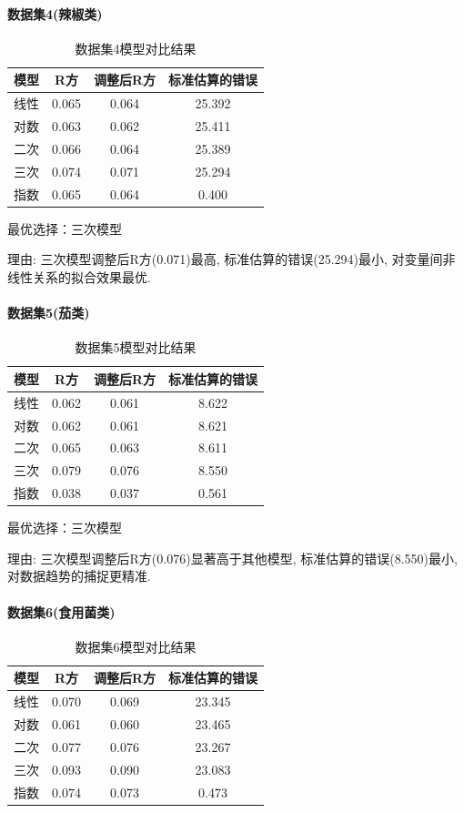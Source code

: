 \documentclass{cumcmthesis}
\begin{document}
\paragraph{数据集4(辣椒类)}
\begin{table}[H]
\centering
\begin{tabular}{cccc}
\hline
模型 & R方 & 调整后R方 & 标准估算的错误 \\
\hline
线性 & 0.065 & 0.064 & 25.392 \\
对数 & 0.063 & 0.062 & 25.411 \\
二次 & 0.066 & 0.064 & 25.389 \\
三次 & 0.074 & 0.071 & 25.294 \\
指数 & 0.065 & 0.064 & 0.400 \\
\hline
\end{tabular}
\caption{数据集4模型对比结果}
\label{tab:dataset4}
\end{table}

最优选择：三次模型

理由: 三次模型调整后R方(0.071)最高, 标准估算的错误(25.294)最小, 对变量间非线性关系的拟合效果最优. 


\paragraph{数据集5(茄类)}
\begin{table}[H]
\centering
\begin{tabular}{cccc}
\hline
模型 & R方 & 调整后R方 & 标准估算的错误 \\
\hline
线性 & 0.062 & 0.061 & 8.622 \\
对数 & 0.062 & 0.061 & 8.621 \\
二次 & 0.065 & 0.063 & 8.611 \\
三次 & 0.079 & 0.076 & 8.550 \\
指数 & 0.038 & 0.037 & 0.561 \\
\hline
\end{tabular}
\caption{数据集5模型对比结果}
\label{tab:dataset5}
\end{table}

最优选择：三次模型

理由: 三次模型调整后R方(0.076)显著高于其他模型, 标准估算的错误(8.550)最小, 对数据趋势的捕捉更精准. 


\paragraph{数据集6(食用菌类)}
\begin{table}[H]
\centering
\begin{tabular}{cccc}
\hline
模型 & R方 & 调整后R方 & 标准估算的错误 \\
\hline
线性 & 0.070 & 0.069 & 23.345 \\
对数 & 0.061 & 0.060 & 23.465 \\
二次 & 0.077 & 0.076 & 23.267 \\
三次 & 0.093 & 0.090 & 23.083 \\
指数 & 0.074 & 0.073 & 0.473 \\
\hline
\end{tabular}
\caption{数据集6模型对比结果}
\label{tab:dataset6}
\end{table}
\end{document}
